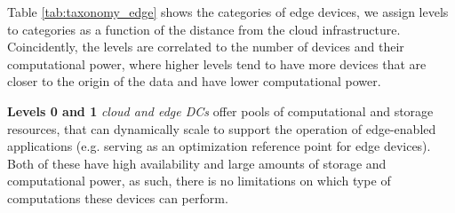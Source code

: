 \begin{table}[!htb]
    \caption{Taxonomy of the edge environment}
    \begin{minipage}{.45\linewidth}
        \centering
    \end{minipage} %
    \begin{minipage}{.45\linewidth}
        \centering
    \end{minipage} 
    \label{tab:taxonomy_edge}
\end{table}

Table \ref{tab:taxonomy_edge} shows the categories of edge devices, we assign levels to categories as a function of the distance from the cloud infrastructure. Coincidently, the levels are correlated to the number of devices and their computational power, where higher levels tend to have more devices that are closer to the origin of the data and have lower computational power.

\textbf{Levels 0 and 1} \textit{cloud and edge DCs} offer pools of computational and storage resources, that can dynamically scale to support the operation of edge-enabled applications (e.g. serving as an optimization reference point for edge devices). Both of these have high availability and large amounts of storage and computational power, as such, there is no limitations on which type of computations these devices can perform.

